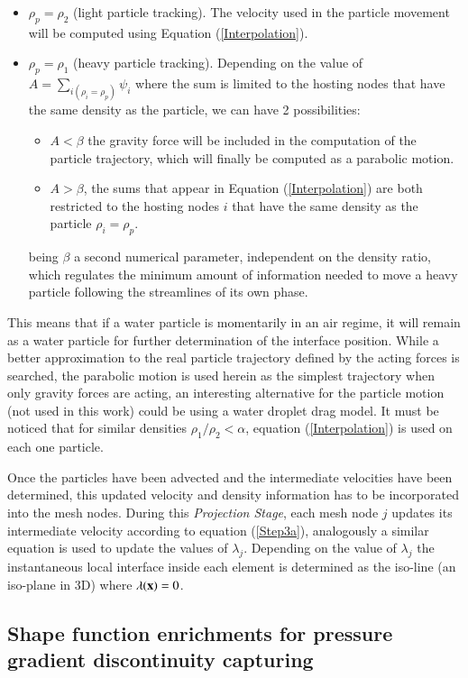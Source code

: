  \begin{itemize}
    \item $\rho_p=\rho_2$ (light particle tracking). The velocity used in the particle movement will be computed using Equation (\ref{Interpolation}).
    \item $\rho_p=\rho_1$ (heavy particle tracking). Depending on the value of $A=\sum_{i(\rho_i=\rho_p)}\psi_i$ where the sum is limited to the hosting nodes that have the same density as the particle, we can have 2 possibilities:
    \begin{itemize}
      \item $A<\beta$  the gravity force will be included in the computation of the particle trajectory, which will finally be computed as a parabolic motion.
      \item $A>\beta$, the sums that appear in Equation (\ref{Interpolation}) are both restricted to the hosting nodes $i$ that have the same density as the particle $\rho_i=\rho_p$.
    \end{itemize}
    being $\beta$ a second numerical parameter, independent on the density ratio, which regulates the minimum amount of information needed to move a heavy particle following the streamlines of its own phase. 
 \end{itemize}
This means that if a water particle is momentarily in an air regime, it will remain as a water particle for further determination of the interface position. While a better approximation to the real particle trajectory defined by the acting forces is searched, the parabolic motion is used herein as the simplest trajectory when only gravity forces are acting, an interesting alternative for the particle motion (not used in this work) could be using a water droplet drag model. It must be noticed that for similar densities $\rho_1/\rho_2<\alpha$, equation (\ref{Interpolation}) is used on each one particle.

Once the particles have been advected and the intermediate velocities have been determined, this updated velocity and density information has to be incorporated into the mesh nodes. During this \textit{Projection Stage}, each mesh node $j$ updates its intermediate velocity according to equation (\ref{Step3a}), analogously a similar equation is used to update the values of $\lambda_j$. Depending on the value of $\lambda_j$ the instantaneous local interface inside each element is determined as the iso-line (an iso-plane in 3D) where $\lambda(\mathbf{x})=0$.

\subsection[Enriched Shape Functions]{Shape function enrichments for pressure gradient discontinuity capturing}

